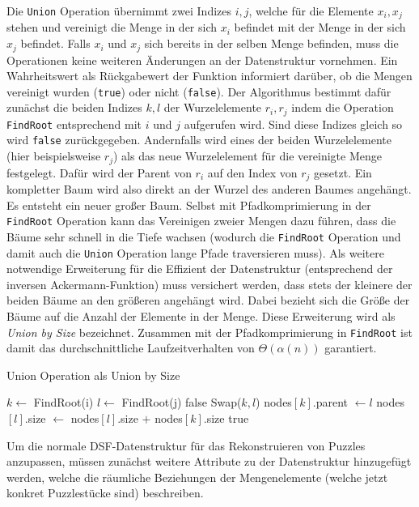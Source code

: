 \documentclass{whswinvcbook}
\begin{document}
Die \texttt{Union} Operation übernimmt zwei Indizes $i,j$, welche für die Elemente $x_i,x_j$ stehen und vereinigt die Menge in der sich $x_i$ befindet mit der Menge in der sich $x_j$ befindet. Falls $x_i$ und $x_j$ sich bereits in der selben Menge befinden, muss die Operationen keine weiteren Änderungen an der Datenstruktur vornehmen. Ein Wahrheitswert als Rückgabewert der Funktion informiert darüber, ob die Mengen vereinigt wurden (\texttt{true}) oder nicht (\texttt{false}). Der Algorithmus bestimmt dafür zunächst die beiden Indizes $k,l$ der Wurzelelemente $r_i,r_j$ indem die Operation \texttt{FindRoot} entsprechend mit $i$ und $j$ aufgerufen wird. Sind diese Indizes gleich so wird \texttt{false} zurückgegeben. Andernfalls wird eines der beiden Wurzelelemente (hier beispielsweise $r_j$) als das neue Wurzelelement für die vereinigte Menge festgelegt. Dafür wird der Parent von $r_i$ auf den Index von $r_j$ gesetzt. Ein kompletter Baum wird also direkt an der Wurzel des anderen Baumes angehängt. Es entsteht ein neuer großer Baum. Selbst mit Pfadkomprimierung in der \texttt{FindRoot} Operation kann das Vereinigen zweier Mengen dazu führen, dass die Bäume sehr schnell in die Tiefe wachsen (wodurch die \texttt{FindRoot} Operation und damit auch die \texttt{Union} Operation lange Pfade traversieren muss). Als weitere notwendige Erweiterung für die Effizient der Datenstruktur (entsprechend der inversen Ackermann-Funktion) muss versichert werden, dass stets der kleinere der beiden Bäume an den größeren angehängt wird. Dabei bezieht sich die Größe der Bäume auf die Anzahl der Elemente in der Menge. Diese Erweiterung wird als \textit{Union by Size} bezeichnet. Zusammen mit der Pfadkomprimierung in \texttt{FindRoot} ist damit das durchschnittliche Laufzeitverhalten von $\Theta(\alpha(n))$ garantiert.
\begin{algorithm}[H]
    \caption{Union Operation als Union by Size}\label{alg-dsf-union}
    \begin{algorithmic}
            \State $k\gets$ FindRoot(i)
            \State $l\gets$ FindRoot(j)
                \State \Return false
            \EndIf
                \State Swap($k,l$)
            \EndIf
            \State nodes$[k]$.parent $\gets l$
            \State nodes$[l]$.size $\gets$ nodes$[l]$.size $+$ nodes$[k]$.size
            \State \Return true
        \EndFunction
    \end{algorithmic}
\end{algorithm}
Um die normale DSF-Datenstruktur für das Rekonstruieren von Puzzles anzupassen, müssen zunächst weitere Attribute zu der Datenstruktur hinzugefügt werden, welche die räumliche Beziehungen der Mengenelemente (welche jetzt konkret Puzzlestücke sind) beschreiben.
\end{document}
